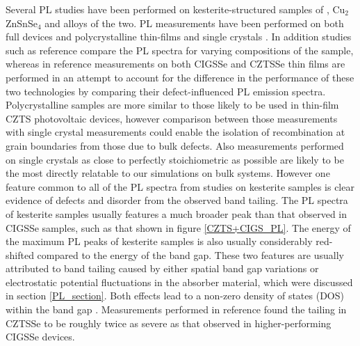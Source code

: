 Several PL studies have been performed on kesterite-structured samples of {\CZTS}, Cu$_2$ZnSnSe$_4$ and alloys of the two. PL measurements have been performed on both full devices and polycrystalline thin-films \cite{band_tail, Gershon, Gershon_ref18, Romero, Miyamoto, Unold} and single crystals \cite{Halliday, Levcenko, Hones}. In addition studies such as reference  compare the PL spectra for varying compositions of the sample, whereas in reference  measurements on both CIGSSe and CZTSSe thin films are performed in an attempt to account for the difference in the performance of these two technologies by comparing their defect-influenced PL emission spectra. Polycrystalline samples are more similar to those likely to be used in thin-film CZTS photovoltaic devices, however comparison between those measurements with single crystal measurements could enable the isolation of recombination at grain boundaries from those due to bulk defects. Also measurements performed on single crystals as close to perfectly stoichiometric {\CZTS} as possible are likely to be the most directly relatable to our simulations on bulk systems. However one feature common to all of the PL spectra from studies on kesterite samples is clear evidence of defects and disorder from the observed band tailing. The PL spectra of kesterite samples usually features a much broader peak than that observed in CIGSSe samples, such as that shown in figure \ref{CZTS+CIGS_PL}. The energy of the maximum PL peaks of kesterite samples is also usually considerably red-shifted compared to the energy of the band gap. These two features are usually attributed to band tailing caused by either spatial band gap variations or electrostatic potential fluctuations in the absorber material, which were discussed in section \ref{PL_section}.  Both effects lead to a non-zero density of states (DOS) within the band gap \cite{culprit, band_tail}. 
Measurements performed in reference  found the tailing in CZTSSe to be roughly twice as severe as that observed in higher-performing CIGSSe devices.


